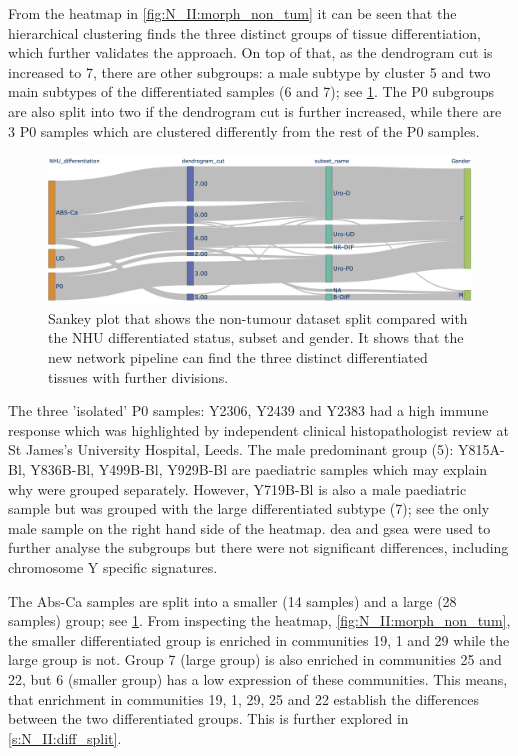 From the heatmap in \cref{fig:N_II:morph_non_tum} it can be seen that the hierarchical clustering finds the three distinct groups of tissue differentiation, which further validates the approach. On top of that, as the dendrogram cut is increased to 7, there are other subgroups: a male subtype by cluster 5 and two main subtypes of the differentiated samples (6 and 7); see \cref{fig:N_II:non_tum_sankey_comp}. The P0 subgroups are also split into two if the dendrogram cut is further increased, while there are 3 P0 samples which are clustered differently from the rest of the P0 samples. 

\begin{figure}[!t]    
    \centering
    \includegraphics[width=1.0\textwidth,height=1.0\textheight,keepaspectratio]{Sections/Network_II/resources/non_tum/non_tum_split.png}
    \caption{Sankey plot that shows the non-tumour dataset split compared with the NHU differentiated status, subset and gender. It shows that the new network pipeline can find the three distinct differentiated tissues with further divisions.}
    \label{fig:N_II:non_tum_sankey_comp}
\end{figure}

The three 'isolated' P0 samples: Y2306, Y2439 and Y2383 had a high immune response which was highlighted by independent clinical histopathologist review at St James's University Hospital, Leeds. The male predominant group (5): Y815A-Bl, Y836B-Bl, Y499B-Bl, Y929B-Bl are paediatric samples which may explain why were grouped separately. However, Y719B-Bl is also a male paediatric sample but was grouped with the large differentiated subtype (7); see the only male sample on the right hand side of the heatmap. \acrfull{dea} and \acrfull{gsea} were used to further analyse the subgroups but there were not significant differences, including chromosome Y specific signatures.

The Abs-Ca samples are split into a smaller (14 samples) and a large (28 samples) group; see \cref{fig:N_II:non_tum_sankey_comp}. From inspecting the heatmap, \cref{fig:N_II:morph_non_tum}, the smaller differentiated group is enriched in communities 19, 1 and 29 while the large group is not. Group 7 (large group) is also enriched in communities 25 and 22,  but 6 (smaller group) has a low expression of these communities. This means, that enrichment in communities 19, 1, 29, 25 and 22 establish the differences between the two differentiated groups. This is further explored in \cref{s:N_II:diff_split}.


